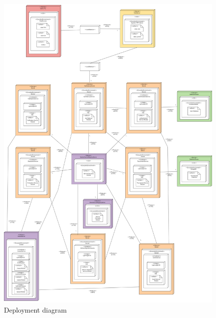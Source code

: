 \begin{figure}[H]
    \centering
    \vspace{-4cm}
    \hspace{1cm}
    \includegraphics[width=1.1\textwidth]{Diagrams/deployment_diagram.png}
    \caption{Deployment diagram}
    \label{deployment_diagram}
\end{figure}

